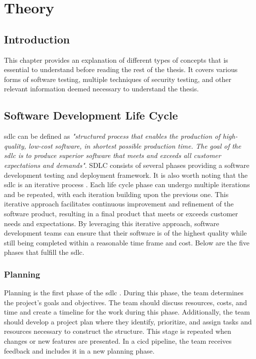 \newpage
\thispagestyle{empty}
\mbox{}
\chapter{Theory}
\label{chap:Theory}

\section{Introduction}
This chapter provides an explanation of different types of concepts that is essential to understand before reading the rest of the thesis. It covers various forms of software testing, multiple techniques of security testing, and other relevant information deemed necessary to understand the thesis.

\section{Software Development Life Cycle}
\acrlong{sdlc} can be defined as \textit{"structured process that enables the production of high-quality, low-cost software, in shortest possible production time. The goal of the \acrshort{sdlc} is to produce superior software that meets and exceeds all customer expectations and demands"}\cite{sdlc1}. SDLC consists of several phases providing a software development testing and deployment framework. It is also worth noting that the \acrlong{sdlc} is an iterative process \cite{sdlcinterative}. Each life cycle phase can undergo multiple iterations and be repeated, with each iteration building upon the previous one. This iterative approach facilitates continuous improvement and refinement of the software product, resulting in a final product that meets or exceeds customer needs and expectations. By leveraging this iterative approach, software development teams can ensure that their software is of the highest quality while still being completed within a reasonable time frame and cost. Below are the five phases that fulfill the \acrshort{sdlc}. 

\subsection{Planning} 
Planning is the first phase of the \acrshort{sdlc} \cite{planningphase}. During this phase, the team determines the project's goals and objectives. The team should discuss resources, costs, and time and create a timeline for the work during this phase. Additionally, the team should develop a project plan where they identify, prioritize, and assign tasks and resources necessary to construct the structure. This stage is repeated when changes or new features are presented. In a \acrshort{cicd} pipeline, the team receives feedback and includes it in a new planning phase.

